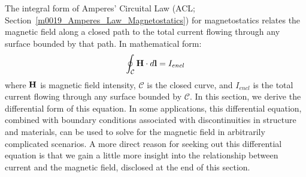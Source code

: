 

\label{m0118_Amperes_Law_Magnetostatics_Integral-to-Differential} %

The integral form of Amperes' Circuital Law 
(ACL; Section~\ref{m0019_Amperes_Law_Magnetostatics}) for magnetostatics relates the magnetic field along a closed path to the total current flowing through any surface bounded by that path.
In mathematical form:
%
\begin{equation}
\oint_{\mathcal C}{ {\bf H} \cdot d{\bf l} } = I_{encl}  
\end{equation}
%
where ${\bf H}$ is magnetic field intensity, ${\mathcal C}$ is the closed curve, and $I_{encl}$ is the total current flowing through any surface bounded by ${\mathcal C}$.
In this section, we derive the differential form of this equation.
In some applications, this differential equation, combined with boundary conditions associated with discontinuities in structure and materials, can be used to solve for the magnetic field in arbitrarily complicated scenarios.  
A more direct reason for seeking out this differential equation is that we gain a little more insight into the relationship between current and the magnetic field, disclosed at the end of this section.


